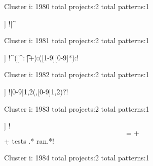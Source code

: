 Cluster i: 1980
total projects:2
total patterns:1
\begin{multicols}{1}
\begin{description}[noitemsep,topsep=0pt]
\item [[2] ] \cverb![^%
\end{description}
\end{multicols}







Cluster i: 1981
total projects:2
total patterns:1
\begin{multicols}{1}
\begin{description}[noitemsep,topsep=0pt]
\item [[2] ] \cverb!^([^: \t\n]+):([1-9][0-9]*):!
\end{description}
\end{multicols}







Cluster i: 1982
total projects:2
total patterns:1
\begin{multicols}{1}
\begin{description}[noitemsep,topsep=0pt]
\item [[2] ] \cverb![0-9]{1,2}(,[0-9]{1,2})?!
\end{description}
\end{multicols}







Cluster i: 1983
total projects:2
total patterns:1
\begin{multicols}{1}
\begin{description}[noitemsep,topsep=0pt]
\item [[2] ] \cverb!\[=+\] \d+ tests .* ran.*!
\end{description}
\end{multicols}







Cluster i: 1984
total projects:2
total patterns:1
\begin{multicols}{1}
\end{multicols}







